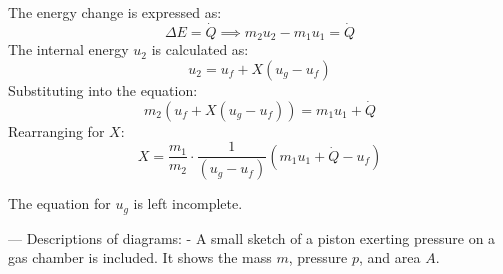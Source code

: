 The energy change is expressed as:  
\[
\Delta E = \dot{Q} \implies m_2 u_2 - m_1 u_1 = \dot{Q}
\]  
The internal energy \( u_2 \) is calculated as:  
\[
u_2 = u_f + X (u_{g} - u_f)
\]  
Substituting into the equation:  
\[
m_2 (u_f + X (u_{g} - u_f)) = m_1 u_1 + \dot{Q}
\]  
Rearranging for \( X \):  
\[
X = \frac{m_1}{m_2} \cdot \frac{1}{(u_{g} - u_f)} \left( m_1 u_1 + \dot{Q} - u_f \right)
\]  

The equation for \( u_g \) is left incomplete.  

---  
Descriptions of diagrams:  
- A small sketch of a piston exerting pressure on a gas chamber is included. It shows the mass \( m \), pressure \( p \), and area \( A \).